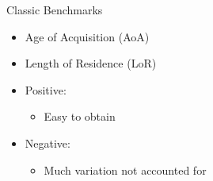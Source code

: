 \documentclass{beamer}
\begin{document}
\begin{frame}{Classic Benchmarks} %
    \begin{itemize}
        \item Age of Acquisition (AoA)
        \item Length of Residence (LoR) \\
       \item Positive:
        \begin{itemize}
          \item Easy to obtain
        \end{itemize}
       \item Negative:
        \begin{itemize}
         \item Much variation not accounted for
        \end{itemize}
    \end{itemize}
\end{frame}
\end{document}
